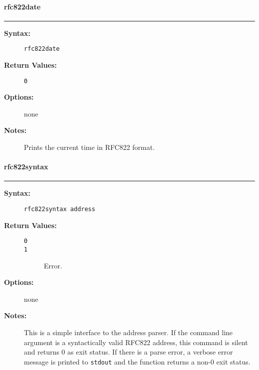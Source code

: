 \vspace {2pt}


\paragraph{rfc822date}

\hrule
\begin{description}
\item[{\bf Syntax:}] \mbox{}

{\tt rfc822date}

\item[{\bf Return Values:}] \mbox{}

\begin{description}
\item[{\tt 0}] \mbox{}



\end{description}


\item[{\bf Options:}] \mbox{}

none

\item[{\bf Notes:}] \mbox{}

Prints the current time in RFC822 format. 

\end{description}


\vspace {2pt}


\paragraph{rfc822syntax}

\hrule
\begin{description}
\item[{\bf Syntax:}] \mbox{}

{\tt rfc822syntax address}

\item[{\bf Return Values:}] \mbox{}

\begin{description}
\item[{\tt 0}] \mbox{}



\item[{\tt 1}] \mbox{}

Error.

\end{description}


\item[{\bf Options:}] \mbox{}

none  

\item[{\bf Notes:}] \mbox{}

This is a simple interface to the address 
parser. If the command line argument is a syntactically valid 
RFC822 address, this command is silent and returns 0 as exit 
status. If there is a parse error, a verbose error message is 
printed to {\tt stdout} and the function returns a non-0 
exit status. 

\end{description}


